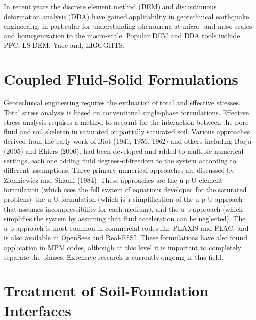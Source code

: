 In recent years the discrete element method (DEM) and discontinuous deformation analysis (DDA) have gained applicability in geotechnical earthquake engineering; in particular for understanding phenomena at micro- and meso-scales and homogenization to the macro-scale. Popular DEM and DDA tools include PFC, LS-DEM, Yade and, LIGGGHTS.   

\section{Coupled Fluid-Solid Formulations}
\label{sec:resp_geotech_2}

Geotechnical engineering requires the evaluation of total and effective stresses. Total stress analysis is based on conventional single-phase formulations. Eﬀective stress analysis requires a method to account for the interaction between the pore ﬂuid and soil skeleton in saturated or partially saturated soil. Various approaches derived from the early work of Biot (1941, 1956, 1962) \cite{Biot41, Biot56, Biot62} and others including Borja (2005) and Ehlers (2006), had been developed and added to multiple numerical settings, each one adding ﬂuid degrees-of-freedom to the system according to diﬀerent assumptions. Three primary numerical approaches are discussed by Zienkiewicz and Shiomi (1984). These approaches are the u-p-U element formulation (which uses the full system of equations developed for the saturated problem), the u-U formulation (which is a simpliﬁcation of the u-p-U approach that assumes incompressibility for each medium), and the u-p approach (which simpliﬁes the system by assuming that ﬂuid acceleration can be neglected). The u-p approach is most common in commercial codes like PLAXIS and FLAC, and is also available in OpenSees and Real-ESSI. These formulations have also found application in MPM codes, although at this level it is important to completely separate the phases. Extensive research is currently ongoing in this field. 

\section{Treatment of Soil-Foundation Interfaces}
\label{sec:resp_geotech_3}

